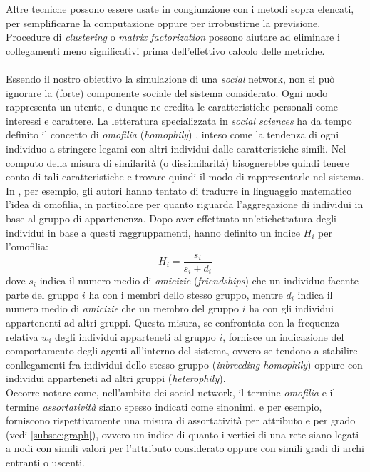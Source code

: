 \documentclass[a4paper,12pt]{article}
\begin{document}
Altre tecniche possono essere usate in congiunzione con i metodi sopra elencati, per semplificarne la computazione oppure per irrobustirne la previsione. Procedure di \textit{clustering} o \textit{matrix factorization} possono aiutare ad eliminare i collegamenti meno significativi prima dell'effettivo calcolo delle metriche. \\
\\
Essendo il nostro obiettivo la simulazione di una \textit{social} network, non si può ignorare la (forte) componente sociale del sistema considerato. Ogni nodo rappresenta un utente, e dunque ne eredita le caratteristiche personali come interessi e carattere. La letteratura specializzata in \textit{social sciences} ha da tempo definito il concetto di \textit{omofilia} (\textit{homophily}) \cite{homo} \cite{newman}, inteso come la tendenza di ogni individuo a stringere legami con altri individui dalle caratteristiche simili. Nel computo della misura di similarità (o dissimilarità) bisognerebbe quindi tenere conto di tali caratteristiche e trovare quindi il modo di rappresentarle nel sistema. In \cite{group}, per esempio, gli autori hanno tentato di tradurre in linguaggio matematico l'idea di omofilia, in particolare per quanto riguarda l'aggregazione di individui in base al gruppo di appartenenza. Dopo aver effettuato un'etichettatura degli individui in base a questi raggruppamenti, hanno definito un indice  $H_i$ per l'omofilia:
\begin{equation}
H_i = \dfrac{s_i}{s_i + d_i}
\end{equation}
dove $s_i$ indica il numero medio di \textit{amicizie} (\textit{friendships}) che un individuo facente parte del gruppo $i$ ha con i membri dello stesso gruppo, mentre $d_i$ indica il numero medio di \textit{amicizie} che un membro del gruppo $i$ ha con gli individui appartenenti ad altri gruppi. Questa misura, se confrontata con la frequenza relativa $w_i$ degli individui apparteneti al gruppo $i$, fornisce un indicazione del comportamento degli agenti all'interno del sistema, ovvero se tendono a stabilire conllegamenti fra individui dello stesso gruppo (\textit{inbreeding homophily}) oppure con individui apparteneti ad altri gruppi (\textit{heterophily}).\\
Occorre notare come, nell'ambito dei social network, il termine \textit{omofilia} e il termine \textit{assortatività} siano spesso indicati come sinonimi. \cite{newman} e \cite{assor} per esempio, forniscono rispettivamente una misura di assortatività per attributo e per grado (vedi \ref{subsec:graph}), ovvero un indice di quanto i vertici di una rete siano legati a nodi con simili valori per l'attributo considerato oppure con simili gradi di archi entranti o uscenti.
\end{document}
